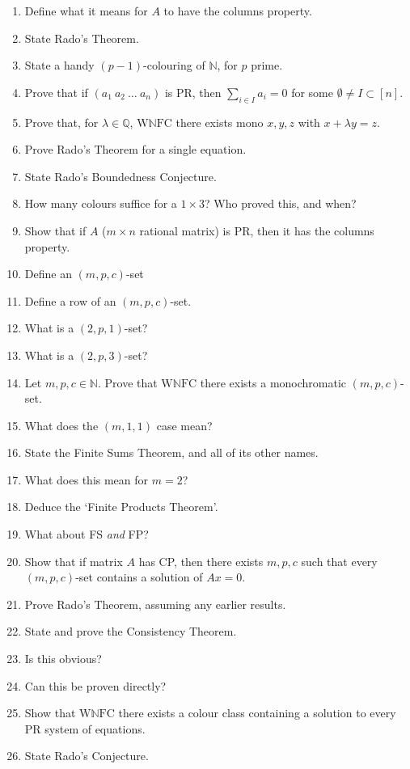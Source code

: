\documentclass[10pt]{article}
\newcommand{\bb}[1]{\mathbb{#1}}
\newcommand{\N}{\bb{N}}
\newcommand{\Q}{\bb{Q}}
\newcommand{\wnfc}{\textrm{W}\N\textrm{FC}}
\begin{document}
\begin{enumerate}
    \item Define what it means for $A$ to have the columns property.
    \item State Rado's Theorem.
    \item State a handy $(p-1)$-colouring of $\N$, for $p$ prime.
    \item Prove that if $(a_1 \ a_2 \ \dots \ a_n)$ is PR, then $\sum_{i\in I}a_i = 0$ for some $\emptyset\ne I \subset [n]$.
    \item Prove that, for $\lambda \in \Q$, $\wnfc$ there exists mono $x,y,z$ with $x + \lambda y = z$.
    \item Prove Rado's Theorem for a single equation.
    \item State Rado's Boundedness Conjecture.
    \item How many colours suffice for a $1\times 3$? Who proved this, and when?
    \item Show that if $A$ ($m\times n$ rational matrix) is PR, then it has the columns property.
    \item Define an $(m,p,c)$-set
    \item Define a row of an $(m,p,c)$-set.
    \item What is a $(2,p,1)$-set?
    \item What is a $(2,p,3)$-set?
    \item Let $m,p,c\in\N$. Prove that $\wnfc$ there exists a monochromatic $(m,p,c)$-set.
    \item What does the $(m,1,1)$ case mean?
    \item State the Finite Sums Theorem, and all of its other names.
    \item What does this mean for $m = 2$?
    \item Deduce the `Finite Products Theorem'.
    \item What about FS \textit{and} FP?
    \item Show that if matrix $A$ has CP, then there exists $m,p,c$ such that every $(m,p,c)$-set contains a solution of $Ax = 0$.
    \item Prove Rado's Theorem, assuming any earlier results.
    \item State and prove the Consistency Theorem.
    \item Is this obvious?
    \item Can this be proven directly?
    \item Show that $\wnfc$ there exists a colour class containing a solution to every PR system of equations.
    \item State Rado's Conjecture.

\end{enumerate}
\end{document}
